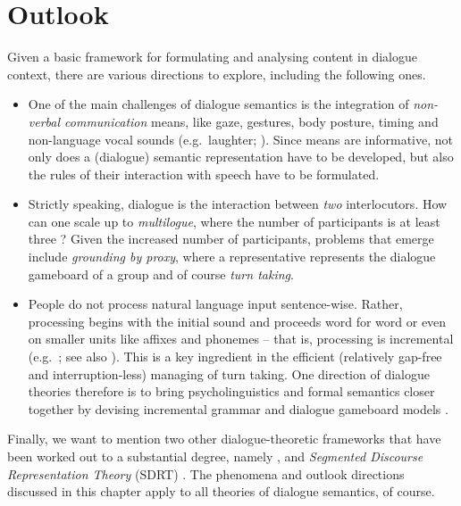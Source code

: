 \documentclass[output=paper
	        ,collection
	        ,collectionchapter
 	        ,biblatex
                ,babelshorthands
                ,newtxmath
                ,draftmode
                ,colorlinks, citecolor=brown
]{langscibook}
\begin{document}
\section{Outlook}
\label{sec:outlook-dialogue}

Given a basic framework for formulating and analysing content in dialogue context, there are various directions to explore, including the following ones.

\begin{itemize}
    \item 
One of the main challenges of dialogue semantics is the integration of \emph{non-verbal communication} means, like gaze, gestures, body posture, timing and non-language  vocal sounds (e.g.\ laughter; \citealt{Ginzburg:Breitholz:Cooper:Hough:Tian:2015,Tian:Mazzocconi:Ginzburg:2016}).
%
Since  means are informative, not only does a (dialogue) semantic representation have to be developed, but also the rules of their interaction with speech have to be formulated. 

\item Strictly speaking, dialogue is the interaction between \emph{two} interlocutors.
%
How can one scale up to \emph{multilogue}, where the number of participants is at least three \citep{Ginzburg:Fernandez:2005}?
%
Given the increased number of participants,  problems that emerge include  \emph{grounding by proxy},  where a representative represents the dialogue gameboard of a group \citep{Eshghi:Healey:2016} and of course \emph{turn taking}.

\item People do not process natural language input sentence-wise.
%
Rather, processing begins with the initial sound and proceeds word for word or even on smaller units like affixes and phonemes -- that is, processing is incremental   (e.g.\ \citealt{Sedivy:Tanenhaus:Chambers:Carlson:1999}; see also ). This is a key ingredient in the efficient (relatively gap-free and interruption-less) managing of turn taking.
%
One direction of dialogue theories therefore is to bring psycholinguistics and formal semantics closer together by devising incremental grammar and dialogue gameboard models \citep{Hough:Kennington:Schlangen:Ginzburg:2015,Demberg:Keller:Koller:2013,Poesio:Rieser:2011}.

\end{itemize}


Finally, we want to mention two other dialogue-theoretic frameworks that have been worked out to a substantial degree, namely  \citep{Traum:1994,Poesio:1995,Poesio:Traum:1997,Poesio:Rieser:2010}, and \emph{Segmented Discourse Representation Theory}  (SDRT) \citep{Asher:1993,Asher:Lascarides:2003,Asher:Lascarides:2013,Hunter:Asher:2015}.
%
The phenomena and outlook directions discussed in this chapter apply to all theories of dialogue semantics, of course. 
\end{document}
